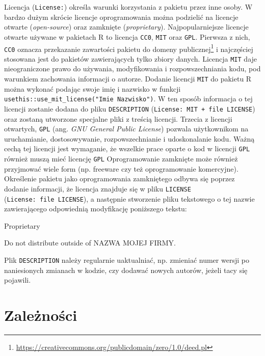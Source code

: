 \documentclass[paper=6in:9in,pagesize=pdftex,headinclude=on,footinclude=on,10pt]{scrbook}
\newenvironment{Shaded}{\begin{snugshade}}{\end{snugshade}}
\newcommand{\NormalTok}[1]{#1}
\DeclareRobustCommand{\href}[2]{#2\footnote{\url{#1}}}
\begin{document}
Licencja (\texttt{License:}) określa warunki korzystania z pakietu przez inne osoby.
W bardzo dużym skrócie licencje oprogramowania można podzielić na licencje otwarte (\emph{open-source}) oraz zamknięte (\emph{proprietary}).
Najpopularniejsze licencje otwarte używane w pakietach R to licencja \texttt{CC0}, \texttt{MIT} oraz \texttt{GPL}.
Pierwsza z nich, \texttt{CC0} oznacza przekazanie \href{https://creativecommons.org/publicdomain/zero/1.0/deed.pl}{zawartości pakietu do domeny publicznej} i najczęściej stosowana jest do pakietów zawierających tylko zbiory danych.
Licencja \texttt{MIT} daje nieograniczone prawo do używania, modyfikowania i rozpowszechniania kodu, pod warunkiem zachowania informacji o autorze.
Dodanie licencji \texttt{MIT} do pakietu R można wykonać podając swoje imię i nazwisko w funkcji \texttt{usethis::use\_mit\_license("Imie\ Nazwisko")}.
W ten sposób informacja o tej licencji zostanie dodana do pliku \texttt{DESCRIPTION} (\texttt{License:\ MIT\ +\ file\ LICENSE}) oraz zostaną utworzone specjalne pliki z treścią licencji.
Trzecia z licencji otwartych, \texttt{GPL} (ang. \emph{GNU General Public License}) pozwala użytkownikom na uruchamianie, dostosowywanie, rozpowszechnianie i udoskonalanie kodu.
Ważną cechą tej licencji jest wymaganie, że wszelkie prace oparte o kod w licencji \texttt{GPL} również muszą mieć licencję \texttt{GPL}
Oprogramowanie zamknięte może również przyjmować wiele form (np. freeware czy też oprogramowanie komercyjne).
Określenie pakietu jako oprogramowania zamkniętego odbywa się poprzez dodanie informacji, że licencja znajduje się w pliku \texttt{LICENSE} (\texttt{License:\ file\ LICENSE}), a następnie stworzenie pliku tekstowego o tej nazwie zawierającego odpowiednią modyfikację poniższego tekstu:

\begin{Shaded}
\begin{Highlighting}[]
\NormalTok{Proprietary }

\NormalTok{Do not distribute outside of NAZWA MOJEJ FIRMY.}
\end{Highlighting}
\end{Shaded}

Plik \texttt{DESCRIPTION} należy regularnie uaktualniać, np. zmieniać numer wersji po naniesionych zmianach w kodzie, czy dodawać nowych autorów, jeżeli tacy się pojawili.

\hypertarget{zaleznosci}{%
\section{Zależności}\label{zaleznosci}}
\end{document}
